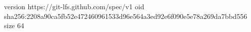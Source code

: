 version https://git-lfs.github.com/spec/v1
oid sha256:2208a90ca5fb52e472460961533d96e564a3ed92e6f090e5e78a269da7bbd556
size 64
